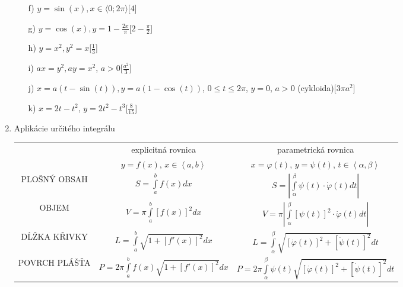\begin{enumerate}
\begin{enumerate}
\item[f)]{$y=\sin(x), x \in \langle 0;2\pi \rangle$}\hspace{\fill}[$4$]
\item[g)]{$y=\cos(x), y=1-\frac{2x}{\pi}$}\hspace{\fill}[$2-\frac{\pi}{2}$]
\item[h)]{$y=x^2, y^2=x$}\hspace{\fill}[$\frac{1}{3}$]
\item[i)]{$ax=y^2, ay=x^2$, $a>0$}\hspace{\fill}[$\frac{a^2}{3}$]
\item[j)]{$x=a(t-\sin(t)), y=a(1-\cos(t))$, $0 \leq t \leq 2\pi$, $y=0$, $a>0$ (cykloida)}\hspace{\fill}[$3\pi a^2$]
\item[k)]{$x=2t-t^2$, $y=2t^2-t^3$}\hspace{\fill}[$\frac{8}{15}$]
\end{enumerate}

\item Aplikácie určitého integrálu
\begin{center}
\begin{tabular}{|c|c|c|}
    \hline
     & explicitná rovnica &  parametrická rovnica\\
     & $y = f\left(x\right)$, $x\in\left\langle a,b\right\rangle$ & $x=\varphi\left(t\right)$, $y=\psi\left(t\right)$, $t\in\left\langle \alpha,\beta\right\rangle$\\
    \hline 
    PLOŠNÝ OBSAH & $S = \int\limits_{a}^{b}f\left(x\right)dx$ &  $S = \left|\int\limits_{\alpha}^{\beta} \psi\left(t\right)\cdot\dot{\varphi}\left(t\right)dt\right| $\\ \hline
    OBJEM        &$V = \pi\int\limits_{a}^{b}\left[f\left(x\right)\right]^2dx$ & $V = \pi\left|\int\limits_{\alpha}^{\beta} \left[\psi\left(t\right)\right]^2\cdot\dot{\varphi}\left(t\right)dt\right| $ \\\hline
    
    DĹŽKA KŘIVKY & $L = \int\limits_{a}^{b}\sqrt{1+\left[f'\left(x\right)\right]^2}dx$& $L = \int\limits_{\alpha}^{\beta}\sqrt{\left[\dot{\varphi}\left(t\right)\right]^2+\left[\dot{\psi}\left(t\right)\right]^2}dt$\\\hline
    
    POVRCH PLÁŠŤA& $P = 2\pi\int\limits_{a}^{b}f\left(x\right)\sqrt{1+\left[f'\left(x\right)\right]^2}dx $ & $P = 2\pi\int\limits_{\alpha}^{\beta}\psi\left(t\right)\sqrt{\left[\dot{\varphi}\left(t\right)\right]^2+\left[\dot{\psi}\left(t\right)\right]^2}dt$\\ \hline
    \end{tabular}
\end{center}






\end{enumerate}
